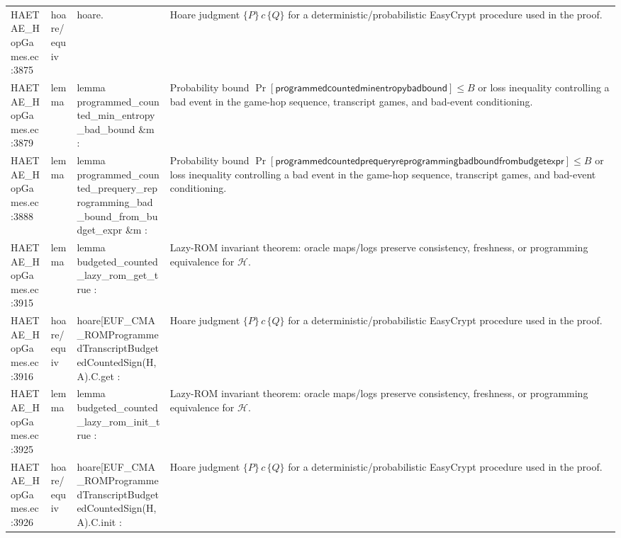 \documentclass[10pt]{article}
\begin{document}
\begin{longtable}{L{0.11\textwidth}L{0.055\textwidth}L{0.385\textwidth}L{0.41\textwidth}}
HAETAE\_\allowbreak{}HopGames.\allowbreak{}ec:\allowbreak{}3875 & hoare/equiv & {\ttfamily\scriptsize hoare.} & Hoare judgment $\{P\}\,c\,\{Q\}$ for a deterministic/probabilistic EasyCrypt procedure used in the proof. \\
HAETAE\_\allowbreak{}HopGames.\allowbreak{}ec:\allowbreak{}3879 & lemma & {\ttfamily\scriptsize lemma programmed\_\allowbreak{}counted\_\allowbreak{}min\_\allowbreak{}entropy\_\allowbreak{}bad\_\allowbreak{}bound \&m :} & Probability bound $\Pr[\mathsf{programmedcountedminentropybadbound}]\le B$ or loss inequality controlling a bad event in the game-hop sequence, transcript games, and bad-event conditioning. \\
HAETAE\_\allowbreak{}HopGames.\allowbreak{}ec:\allowbreak{}3888 & lemma & {\ttfamily\scriptsize lemma programmed\_\allowbreak{}counted\_\allowbreak{}prequery\_\allowbreak{}reprogramming\_\allowbreak{}bad\_\allowbreak{}bound\_\allowbreak{}from\_\allowbreak{}budget\_\allowbreak{}expr \&m :} & Probability bound $\Pr[\mathsf{programmedcountedprequeryreprogrammingbadboundfrombudgetexpr}]\le B$ or loss inequality controlling a bad event in the game-hop sequence, transcript games, and bad-event conditioning. \\
HAETAE\_\allowbreak{}HopGames.\allowbreak{}ec:\allowbreak{}3915 & lemma & {\ttfamily\scriptsize lemma budgeted\_\allowbreak{}counted\_\allowbreak{}lazy\_\allowbreak{}rom\_\allowbreak{}get\_\allowbreak{}true :} & Lazy-ROM invariant theorem: oracle maps/logs preserve consistency, freshness, or programming equivalence for $\mathcal H$. \\
HAETAE\_\allowbreak{}HopGames.\allowbreak{}ec:\allowbreak{}3916 & hoare/equiv & {\ttfamily\scriptsize hoare[EUF\_\allowbreak{}CMA\_\allowbreak{}ROMProgrammedTranscriptBudgetedCountedSign(H, A).C.get :} & Hoare judgment $\{P\}\,c\,\{Q\}$ for a deterministic/probabilistic EasyCrypt procedure used in the proof. \\
HAETAE\_\allowbreak{}HopGames.\allowbreak{}ec:\allowbreak{}3925 & lemma & {\ttfamily\scriptsize lemma budgeted\_\allowbreak{}counted\_\allowbreak{}lazy\_\allowbreak{}rom\_\allowbreak{}init\_\allowbreak{}true :} & Lazy-ROM invariant theorem: oracle maps/logs preserve consistency, freshness, or programming equivalence for $\mathcal H$. \\
HAETAE\_\allowbreak{}HopGames.\allowbreak{}ec:\allowbreak{}3926 & hoare/equiv & {\ttfamily\scriptsize hoare[EUF\_\allowbreak{}CMA\_\allowbreak{}ROMProgrammedTranscriptBudgetedCountedSign(H, A).C.init :} & Hoare judgment $\{P\}\,c\,\{Q\}$ for a deterministic/probabilistic EasyCrypt procedure used in the proof. \\

\end{longtable}
\end{document}
